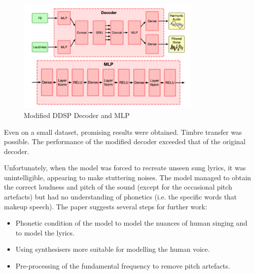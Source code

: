 \vspace{0.5cm}
\vspace{0.5cm}

\begin{figure}[H]
    \centering
    \includegraphics[width=0.8\textwidth]{literature_review/SingingDecoderMLP.png}
    \caption{Modified DDSP Decoder and MLP\cite{SingingDDSP}}
    \label{fig:singing_decoder_mlp}
\end{figure}

Even on a small dataset, promising results were obtained. Timbre transfer was possible. The performance of the modified decoder exceeded that of the original decoder.

Unfortunately, when the model was forced to recreate unseen sung lyrics, it was unintelligible, appearing to make stuttering noises. The model managed to obtain the correct loudness and pitch of the sound (except for the occasional pitch artefacts) but had no understanding of phonetics (i.e. the specific words that makeup speech). The paper suggests several steps for further work:

\begin{itemize}
    \item Phonetic condition of the model to model the nuances of human singing and to model the lyrics.
    \item Using synthesisers more suitable for modelling the human voice.
    \item Pre-processing of the fundamental frequency to remove pitch artefacts.
\end{itemize}

